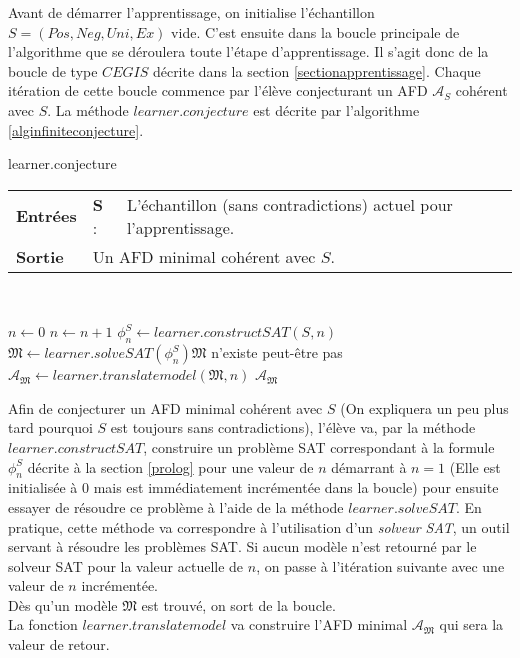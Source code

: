 \documentclass[12pt,a4paper,oneside,titlepage]{report}
\begin{document}
\noindent Avant de démarrer l'apprentissage, on initialise l'échantillon $S=(Pos,Neg,Uni,Ex)$ vide. C'est ensuite dans la boucle principale de l'algorithme que se déroulera toute l'étape d'apprentissage. Il s'agit donc de la boucle de type $CEGIS$ décrite dans la section \ref{sectionapprentissage}. Chaque itération de cette boucle commence par l'élève conjecturant un AFD $\mathcal{A}_S$ cohérent avec $S$. La méthode $learner.conjecture$ est décrite par l'algorithme \ref{alginfiniteconjecture}.

\begin{algorithm}[H]
\caption{learner.conjecture}\label{alginfiniteconjecture}
\hspace*{\algorithmicindent} 
\begin{tabular}{lll}
	\textbf{Entrées} & \textbf{S} : &L'échantillon (sans contradictions) actuel pour l'apprentissage.\\
	\textbf{Sortie} &\multicolumn{2}{l}{Un AFD minimal cohérent avec $S$.}\\
\end{tabular}\\
\begin{algorithmic}[1]
\State $n\gets 0$
\Repeat
	\State $n\gets n+1$
	\State $\phi_n^S\gets learner.constructSAT(S,n)$
	\State $\mathfrak{M} \gets learner.solveSAT(\phi_n^S)$\Comment $\mathfrak{M}$ n'existe peut-être pas
\State $\mathcal{A}_\mathfrak{M}\gets learner.translatemodel(\mathfrak{M},n)$
\State\Return $\mathcal{A}_\mathfrak{M}$
\end{algorithmic}
\end{algorithm}
Afin de conjecturer un AFD minimal cohérent avec $S$ (On expliquera un peu plus tard pourquoi $S$ est toujours sans contradictions), l'élève va, par la méthode $learner.constructSAT$, construire un problème SAT correspondant à la formule $\phi_n^S$ décrite à la section \ref{prolog} pour une valeur de $n$ démarrant à $n=1$ (Elle est initialisée à $0$ mais est immédiatement incrémentée dans la boucle) pour ensuite essayer de résoudre ce problème à l'aide de la méthode $learner.solveSAT$. En pratique, cette méthode va correspondre à l'utilisation d'un \emph{solveur SAT}, un outil servant à résoudre les problèmes SAT. Si aucun modèle n'est retourné par le solveur SAT pour la valeur actuelle de $n$, on passe à l'itération suivante avec une valeur de $n$ incrémentée.\\
Dès qu'un modèle $\mathfrak{M}$ est trouvé, on sort de la boucle.\\
La fonction $learner.translatemodel$ va construire l'AFD minimal $\mathcal{A}_\mathfrak{M}$ qui sera la valeur de retour.
\end{document}
